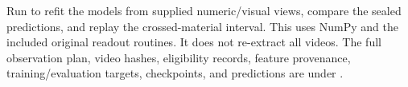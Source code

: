 Run  to refit the models from supplied numeric/visual views, compare the sealed predictions, and replay the crossed-material interval. This uses NumPy and the included original readout routines. It does not re-extract all videos. The full observation plan, video hashes, eligibility records, feature provenance, training/evaluation targets, checkpoints, and predictions are under .
